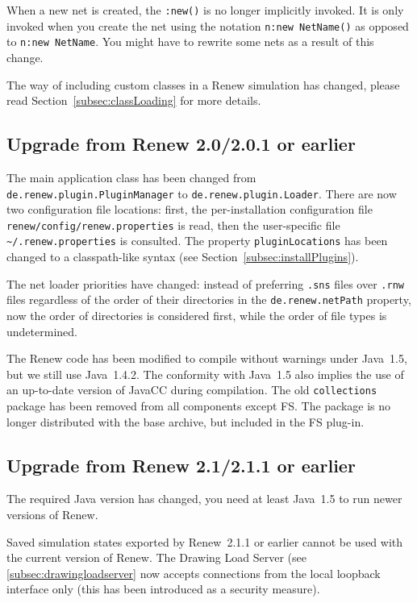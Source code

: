 When a new net is created, the \texttt{:new()} is no longer
implicitly invoked. It is only invoked when you create
the net using the notation \texttt{n:new NetName()} as opposed 
to \texttt{n:new NetName}. You might have to rewrite some
nets as a result of this change.

The way of including custom classes in a Renew simulation has changed,
please read Section~\ref{subsec:classLoading} for more details.

\subsection{Upgrade from Renew 2.0/2.0.1 or earlier}

The main application class has been changed from
\texttt{de.renew.plugin.PluginManager} to \texttt{de.renew.plugin.Loader}.
There are now two configuration file locations: 
first, the per-installation configuration file
\texttt{renew\renewversion{}/config/renew.properties} is read, then
the user-specific file \texttt{\~{}/.renew.properties} is consulted.
The property \texttt{pluginLocations} has been changed to a classpath-like
syntax (see Section~\ref{subsec:installPlugins}).

The net loader priorities have changed: 
instead of preferring \texttt{.sns} files over \texttt{.rnw} files
regardless of the order of their directories in the
\texttt{de.renew.netPath} property, now the order of directories is
considered first, while the order of file types is undetermined.

The Renew code has been modified to compile without warnings under
Java~1.5, but we still use Java~1.4.2.
The conformity with Java~1.5 also implies the use of an up-to-date version
of JavaCC during compilation.
The old \texttt{collections} package has been removed from all components
except FS.
The package is no longer distributed with the base archive, but included in
the FS plug-in.

\subsection{Upgrade from Renew 2.1/2.1.1 or earlier}

The required Java version has changed, you need at least
Java~1.5 to run newer versions of Renew.

Saved simulation states exported by Renew~2.1.1 or earlier cannot be used
with the current version of Renew.
The Drawing Load Server (see \ref{subsec:drawingloadserver} now accepts
connections from the local loopback interface only (this has been
introduced as a security measure).

